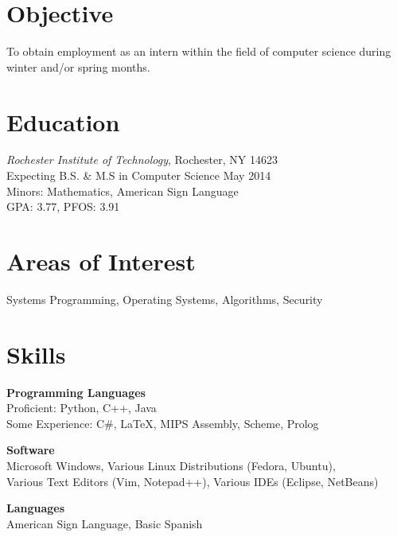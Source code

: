 \documentclass[margin]{res}
\begin{document}

\address{{\bf Present Address} \\ 204 Goldenrod Lane \\
		Rochester, NY 14623 }

\address{{\bf \hfill Permanent Address} \\ \hfill 46 Juniper Drive \\ 
		Clifton Park, NY 12065 }
		
\begin{resume}

\section{Objective}
To obtain employment as an intern within the field of computer science during
winter and/or spring months.


\section{Education}
\emph{Rochester Institute of Technology}, Rochester, NY 14623 \\
Expecting B.S. \& M.S in Computer Science May 2014\\
Minors: Mathematics, American Sign Language \\
GPA: 3.77, PFOS: 3.91

\section{Areas of Interest}
Systems Programming, Operating Systems, Algorithms, Security


\section{Skills}
\textbf{Programming Languages} \\
Proficient: Python, C++, Java \\
Some Experience: C\#, \LaTeX, MIPS Assembly, Scheme, Prolog

\textbf{Software} \\
Microsoft Windows, Various Linux Distributions (Fedora, Ubuntu), \\
Various Text Editors (Vim, Notepad++), Various IDEs (Eclipse, NetBeans)

\textbf{Languages} \\
American Sign Language, Basic Spanish



\end{resume}
\end{document}
